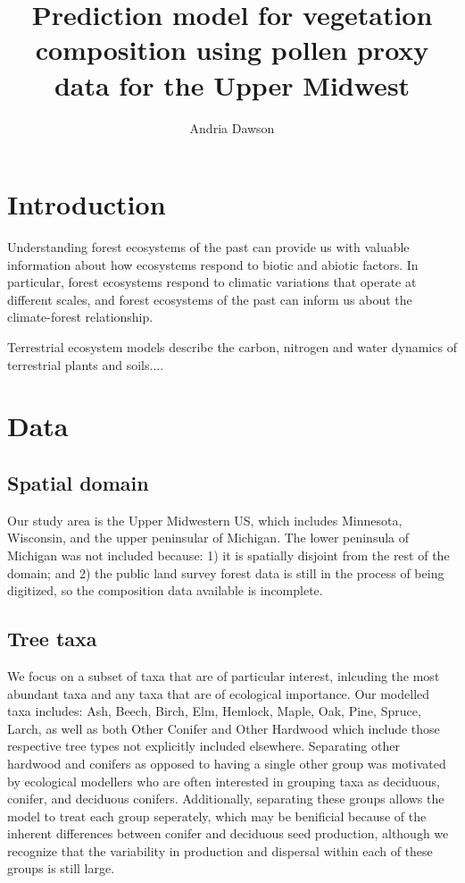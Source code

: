 \documentclass[12pt]{article}
\begin{document}
\nocite{*}

\title{Prediction model for vegetation composition using pollen proxy data for the Upper Midwest}

\author{Andria Dawson}

\maketitle

\section{Introduction}

Understanding forest ecosystems of the past can provide us with valuable information about how ecosystems respond to biotic and abiotic factors. In particular, forest ecosystems respond to climatic variations that operate at different scales, and forest ecosystems of the past can inform us about the climate-forest relationship. 

Terrestrial ecosystem models describe the carbon, nitrogen and water dynamics of terrestrial plants and soils....   

\section{Data}

\subsection{Spatial domain}
Our study area is the Upper Midwestern US, which includes Minnesota, Wisconsin, and the upper peninsular of Michigan. The lower peninsula of Michigan was not included because: 1) it is spatially disjoint from the rest of the domain; and 2) the public land survey forest data is still in the process of being digitized, so the composition data available is incomplete. 

\subsection{Tree taxa}
We focus on a subset of taxa that are of particular interest, inlcuding the most abundant taxa and any taxa that are of ecological importance. Our modelled taxa includes: Ash, Beech, Birch, Elm, Hemlock, Maple, Oak, Pine, Spruce, Larch, as well as both Other Conifer and Other Hardwood which include those respective tree types not explicitly included elsewhere. Separating other hardwood and conifers as opposed to having a single other group was motivated by ecological modellers who are often interested in grouping taxa as deciduous, conifer, and deciduous conifers. Additionally, separating these groups allows the model to treat each group seperately, which may be benificial because of the inherent differences between conifer and deciduous seed production, although we recognize that the variability in production and dispersal within each of these groups is still large.
\end{document}

